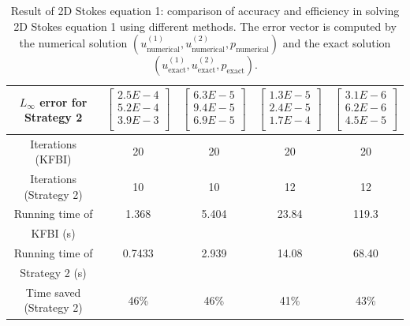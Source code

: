 \documentclass{article}
\begin{document}
\begin{table}[ht]
\begin{tabular}{|c|c|c|c|c|}
         $L_{\infty}$ error for Strategy 2 & $\begin{bmatrix} 2.5E-4 \\ 5.2E-4 \\ 3.9E-3 \\ \end{bmatrix}$ 
         & $\begin{bmatrix} 6.3E-5 \\ 9.4E-5 \\ 6.9E-5 \\ \end{bmatrix}$
         & $\begin{bmatrix} 1.3E-5 \\ 2.4E-5 \\ 1.7E-4 \\ \end{bmatrix}$
         & $\begin{bmatrix} 3.1E-6 \\ 6.2E-6 \\ 4.5E-5 \\ \end{bmatrix}$
         \\ \hline
         Iterations (KFBI) &  20&  20&20 &       20\\ \hline 
         Iterations (Strategy 2)&  10&  10&12 &12\\ \hline 
         Running time of &  1.368&  5.404&23.84 &119.3\\ KFBI (s) & & & & \\ \hline 
         Running time of &  0.7433&  2.939&14.08 &68.40 \\ 
         Strategy 2 (s) & & & & \\ \hline
         Time saved (Strategy 2) & 46\%& 46\%& 41\%& 43\% \\ \hline
    \end{tabular}
    \caption{Result of 2D Stokes equation 1: comparison of accuracy and efficiency in solving 2D Stokes equation 1 using different methods. The error vector is computed by the numerical solution $(u_{\mbox{numerical}}^{(1)}, u_{\mbox{numerical}}^{(2)}, p_{\mbox{numerical}})$ and the exact solution $(u_{\mbox{exact}}^{(1)}, u_{\mbox{exact}}^{(2)}, p_{\mbox{exact}})$.}
    \label{label1_3}
\end{table}
\end{document}
